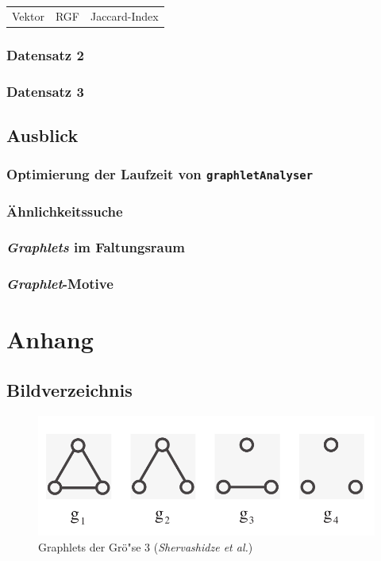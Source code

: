 \documentclass{report}
\begin{document}
\begin{table}
\begin{tabular}{c c c}

Vektor & RGF & Jaccard-Index \\

\end{tabular}
\end{table}


\subsection{Datensatz 2}

\subsection{Datensatz 3}

\section{Ausblick}


\subsection{Optimierung der Laufzeit von \texttt{graphletAnalyser}}

\subsection{\"Ahnlichkeitssuche}

\subsection{\textit{Graphlets} im Faltungsraum}

\subsection{\textit{Graphlet}-Motive}




\chapter{Anhang}


\section{Bildverzeichnis}

\begin{figure}[h!]
\includegraphics[width =\linewidth]{3graphlets.pdf}
\caption{Graphlets der Gr\"o"se 3 (\textit{Shervashidze et al.})}
\label{fig:3graphlets}
\end{figure}
\end{document}
